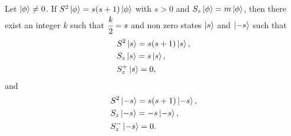 \documentclass[main.tex]{subfiles}
\begin{document}
\begin{lemma}
\label{spin-limiting-lemma}
Let $\ket{\phi}\not = 0$.
If $S^2\ket{\phi} = s(s + 1)\ket{\phi}$ with $s > 0$ and $S_z\ket{\phi} = m\ket{\phi}$, then there exist an integer $k$ such that $\cfrac{k}{2} = s$ and non zero states $\ket{s}$ and $\ket{-s}$ such that
\begin{align}  
& S^2\ket{s} = s(s + 1)\ket{s}, \\
& S_z \ket{s} = s \ket{s},\\
& S^{+}_z \ket{s} = 0,  
\end{align}
and
\begin{align}
& S^2\ket{-s} = s(s + 1)\ket{-s}, \\
& S_z \ket{-s} = -s \ket{-s},\\
& S^{-}_z \ket{-s} = 0.  
\end{align}
\end{lemma}
\end{document}
